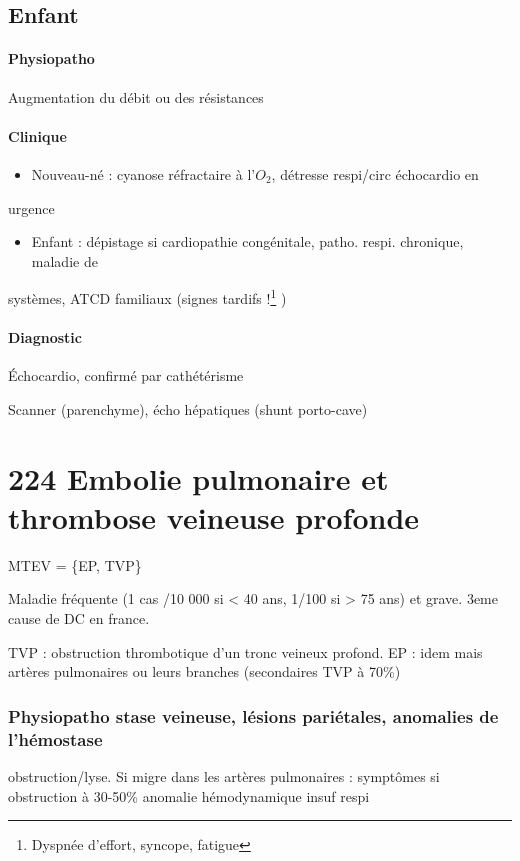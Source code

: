 \documentclass{book}
\begin{document}
\subsection{Enfant}
\label{sec:org6d510f5}

\paragraph{Physiopatho}
\label{sec:org875b55b}
Augmentation du débit ou des résistances

\paragraph{Clinique}
\label{sec:org6af0d08}
\begin{itemize}
\item Nouveau-né : cyanose réfractaire à l'\(O_2\), détresse respi/circ \thus échocardio en
\end{itemize}
urgence \danger
\begin{itemize}
\item Enfant : dépistage si cardiopathie congénitale, patho. respi. chronique, maladie de
\end{itemize}
systèmes, ATCD familiaux (signes tardifs !\footnote{Dyspnée d'effort, syncope, fatigue} )
\paragraph{Diagnostic}
\label{sec:org550c7ad}
Échocardio, confirmé par cathétérisme 

Scanner (parenchyme), écho hépatiques (shunt porto-cave)


\section{224 \textdagger{} Embolie pulmonaire et thrombose veineuse profonde}
\label{sec:orge8c0b97}
\label{sec:224_embolie_pulmonaire_et_thrombose_veineuse_profonde}
\gls{MTEV} = \{\gls{EP}, \gls{TVP}\}

Maladie fréquente (1 cas /10 000 si < 40 ans, 1/100 si > 75 ans) et grave.
3eme cause de DC en france.

TVP : obstruction thrombotique d'un tronc veineux profond. EP : idem mais
artères pulmonaires ou leurs branches (secondaires TVP à 70\%)

\subsubsection{Physiopatho stase veineuse, lésions pariétales, anomalies de l'hémostase \thus}
\label{sec:org55e8b4f}
obstruction/lyse. Si migre dans les artères pulmonaires : symptômes si
obstruction à 30-50\% \thus anomalie hémodynamique \thus insuf respi
\end{document}
